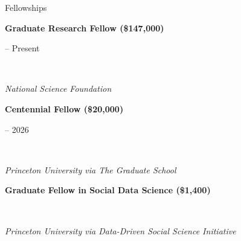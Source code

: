 \documentclass{cv} %
\begin{document}

\begin{cvSection}{Fellowships}

  \begin{minipage}[t]{0.50\linewidth}
    \raggedright \textbf{Graduate Research Fellow (\$147,000)}%
  \end{minipage}
  \hfill
  \begin{minipage}[t]{0.45\linewidth}
     -- Present%
  \end{minipage}
  \\
  \begin{minipage}[t]{0.70\linewidth}
    \raggedright \textit{National Science Foundation}%
  \end{minipage}
  \hfill
  \begin{minipage}[t]{0.25\linewidth}
  \end{minipage}

  \begin{minipage}[t]{0.70\linewidth}
    \raggedright \textbf{Centennial Fellow (\$20,000)}%
  \end{minipage}
  \hfill
  \begin{minipage}[t]{0.25\linewidth}
     -- 2026%
  \end{minipage}
  \\
  \begin{minipage}[t]{0.70\linewidth}
    \raggedright \textit{Princeton University via The Graduate School}%
  \end{minipage}
  \hfill
  \begin{minipage}[t]{0.25\linewidth}
  \end{minipage}

  \begin{minipage}[t]{0.70\linewidth}
    \raggedright \textbf{Graduate Fellow in Social Data Science (\$1,400)}%
  \end{minipage}
  \hfill
  \begin{minipage}[t]{0.25\linewidth}
  \end{minipage}
  \\
  \begin{minipage}[t]{0.70\linewidth}
    \raggedright \textit{Princeton University via Data-Driven Social Science Initiative}%
  \end{minipage}
  \hfill
  \begin{minipage}[t]{0.25\linewidth}
  \end{minipage}

\end{cvSection}
\end{document}
